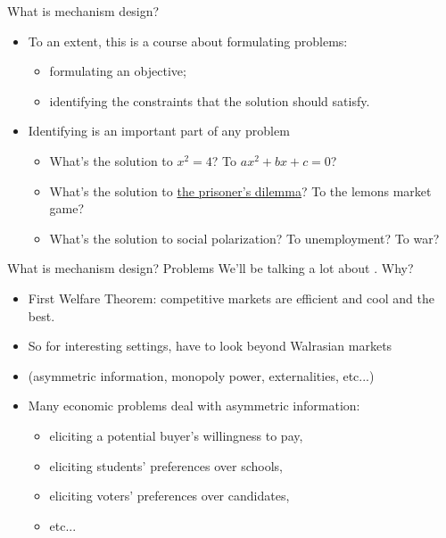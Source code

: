 \documentclass[english,10pt
,aspectratio=169
]{beamer}
\begin{document}
\begin{frame}{What is mechanism design?}
	\begin{itemize}
		\item To an extent, this is a course about \alert{formulating problems}:
		\begin{itemize}
			\item formulating an objective;
			\item \alert{identifying the constraints} that the solution should satisfy.
		\end{itemize}
		
		\pause\bigskip 
		\item Identifying  is an important part of any problem
		\begin{itemize}
			\item What's the solution to $x^2 = 4$? To $a x^2 + bx + c = 0$?
			\pause 
			\item What's the solution to \href{https://www.smbc-comics.com/comic/dilemma-2}{the prisoner's dilemma}? To the lemons market game?
			\pause 
			\item What's the solution to social polarization? To unemployment? To war?
		\end{itemize}
	\end{itemize}
\end{frame}


\begin{frame}{What is mechanism design? Problems}
	We'll be talking a lot about . Why?
	\begin{itemize}
		\item First Welfare Theorem: competitive markets are efficient and cool and the best.
		\item So for interesting settings, have to look beyond Walrasian markets
		\item (asymmetric information, monopoly power, externalities, etc...)
		\pause\bigskip
		\item Many \alert{economic problems} deal with asymmetric information:
		\begin{itemize}
			\item eliciting a potential buyer's willingness to pay,
			\item eliciting students' preferences over schools,
			\item eliciting voters' preferences over candidates,
			\item etc...
		\end{itemize}
	\end{itemize}
\end{frame}
\end{document}

